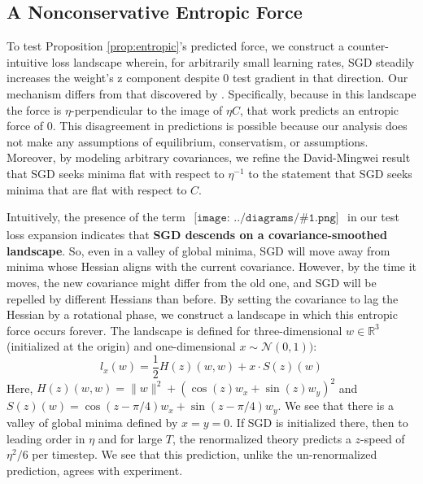 \documentclass{article}
\newcommand{\Nn}{\mathcal{N}}
\newcommand{\RR}{\mathbb{R}}
\newcommand{\sdia}[1]{\begin{gathered}\texttt{[image: ../diagrams/\#1.png]}\end{gathered}}
\begin{document}
    \subsection{A Nonconservative Entropic Force} \label{subsect:entropic}
        To test Proposition \ref{prop:entropic}'s predicted force, 
        we construct a counter-intuitive loss landscape wherein, for
        arbitrarily small learning rates, SGD steadily increases the weight's
        z component despite 0 test gradient in that direction.
        Our mechanism differs from that discovered by \citet{ch18}.
        Specifically, because in this landscape the force is
        $\eta$-perpendicular to the image of $\eta C$, that work predicts an
        entropic force of $0$.  This disagreement in predictions is possible
        because our analysis does not make any assumptions of equilibrium,
        conservatism, or assumptions.
        Moreover, by modeling arbitrary covariances, we refine the
        David-Mingwei result that SGD seeks minima flat with respect to
        $\eta^{-1}$ to the statement that SGD seeks minima that are flat with
        respect to $C$.

        Intuitively, the presence of the term
        $
            \sdia{c(01-2-3)(02-12-23)}
        $
        in our test loss expansion indicates that 
        {\bf SGD descends on a covariance-smoothed landscape}.
        So, even in a valley of global minima, SGD will move away from minima
        whose Hessian aligns with the current covariance.  However, by the time
        it moves, the new covariance might differ from the old one, and SGD will
        be repelled by different Hessians than before.  By setting the
        covariance to lag the Hessian by a rotational phase, we construct
        a landscape in which this entropic force occurs forever. 
        The landscape is defined for
        three-dimensional $w\in \RR^3$ (initialized at the origin) and
        one-dimensional $x \sim \Nn(0, 1))$:
        $$
            l_x(w) = \frac{1}{2} H(z)(w, w) + x \cdot S(z)(w)  
        $$
        Here, $H(z)(w, w) = \|w\|^2 + (\cos(z) w_x + \sin(z) w_y)^2$
        and   $S(z)(w)    = \cos(z-\pi/4) w_x + \sin(z-\pi/4) w_y$.
        We see that there is a valley of global minima defined by $x=y=0$. 
        If SGD is initialized there, then to leading order in $\eta$ and for
        large $T$, the renormalized theory predicts a $z$-speed of $\eta^2/6$ 
        per timestep.  We see that this prediction, unlike the
        un-renormalized prediction, agrees with experiment.
\end{document}
